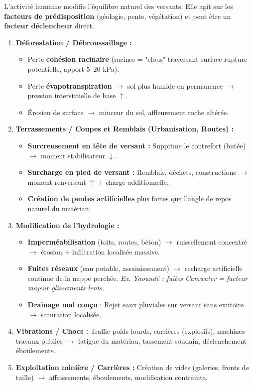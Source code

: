 \documentclass[11pt]{article}
\begin{document}
L'activité humaine modifie l'équilibre naturel des versants. Elle agit sur les \textbf{facteurs de prédisposition} (géologie, pente, végétation) et peut être un \textbf{facteur déclencheur} direct.

\begin{methode}
\begin{enumerate}
    \item \textbf{Déforestation / Débroussaillage :}
    \begin{itemize}
        \item Perte \textbf{cohésion racinaire} (racines = "clous" traversant surface rupture potentielle, apport 5--20 kPa).
        \item Perte \textbf{évapotranspiration} $\rightarrow$ sol plus humide en permanence $\rightarrow$ pression interstitielle de base $\uparrow$.
        \item Érosion de surface $\rightarrow$ minceur du sol, affleurement roche altérée.
    \end{itemize}
    \item \textbf{Terrassements / Coupes et Remblais (Urbanisation, Routes) :}
    \begin{itemize}
        \item \textbf{Surcreusement en tête de versant :} Supprime le contrefort (butée) $\rightarrow$ moment stabilisateur $\downarrow$.
        \item \textbf{Surcharge en pied de versant :} Remblais, déchets, constructions $\rightarrow$ moment renversant $\uparrow$ + charge additionnelle.
        \item \textbf{Création de pentes artificielles} plus fortes que l'angle de repos naturel du matériau.
    \end{itemize}
    \item \textbf{Modification de l'hydrologie :}
    \begin{itemize}
        \item \textbf{Imperméabilisation} (toits, routes, béton) $\rightarrow$ ruissellement concentré $\rightarrow$ érosion + infiltration localisée massive.
        \item \textbf{Fuites réseaux} (eau potable, assainissement) $\rightarrow$ recharge artificielle continue de la nappe perchée. \textit{Ex. Yaoundé : fuites Camwater = facteur majeur glissements lents.}
        \item \textbf{Drainage mal conçu} : Rejet eaux pluviales sur versant sans exutoire $\rightarrow$ saturation localisée.
    \end{itemize}
    \item \textbf{Vibrations / Chocs :} Traffic poids lourds, carrières (explosifs), machines travaux publics $\rightarrow$ fatigue du matériau, tassement soudain, déclenchement éboulements.
    \item \textbf{Exploitation minière / Carrières :} Création de vides (galeries, fronts de taille) $\rightarrow$ affaissements, éboulements, modification contrainte.
\end{enumerate}
\end{methode}
\end{document}
